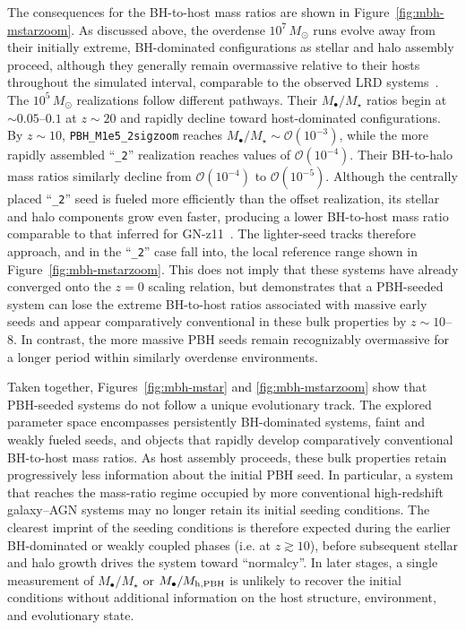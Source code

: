 \documentclass[twocolumn,trackchanges]{aastex701}
\begin{document}
The consequences for the BH-to-host mass ratios are shown in Figure~\ref{fig:mbh-mstarzoom}. As discussed above, the overdense $10^7\,M_\odot$ runs evolve away from their initially extreme, BH-dominated configurations as stellar and halo assembly proceed, although they generally remain overmassive relative to their hosts throughout the simulated interval, comparable to the observed LRD systems~\citep[e.g.,][]{MaiolinoBH2024A&A}. The $10^5\,M_\odot$ realizations follow different pathways. Their $M_\bullet/M_\star$ ratios begin at $\sim0.05$--$0.1$ at $z\sim20$ and rapidly decline toward host-dominated configurations. By $z\sim10$, \texttt{PBH\_M1e5\_2sigzoom} reaches $M_\bullet/M_\star\sim \mathcal{O}(10^{-3})$, while the more rapidly assembled ``\texttt{\_2}'' realization reaches values of $\mathcal{O}(10^{-4})$. Their BH-to-halo mass ratios similarly decline from $\mathcal{O}(10^{-4})$ to $\mathcal{O}(10^{-5})$. Although the centrally placed ``\texttt{\_2}'' seed is fueled more efficiently than the offset realization, its stellar and halo components grow even faster, producing a lower BH-to-host mass ratio comparable to that inferred for GN-z11~\citep{Bunker2023A&AGNz11,Scholtz2024A&A, Maiolino2024NaturBH}. The lighter-seed tracks therefore approach, and in the ``\texttt{\_2}'' case fall into, the local reference range shown in Figure~\ref{fig:mbh-mstarzoom}. This does not imply that these systems have already converged onto the $z=0$ scaling relation, but demonstrates that a PBH-seeded system can lose the extreme BH-to-host ratios associated with massive early seeds and appear comparatively conventional in these bulk properties by $z\sim10$--8. In contrast, the more massive PBH seeds remain recognizably overmassive for a longer period within similarly overdense environments.


Taken together, Figures~\ref{fig:mbh-mstar} and \ref{fig:mbh-mstarzoom} show that PBH-seeded systems do not follow a unique evolutionary track. The explored parameter space encompasses persistently BH-dominated systems, faint and weakly fueled seeds, and objects that rapidly develop comparatively conventional BH-to-host mass ratios. As host assembly proceeds, these bulk properties retain progressively less information about the initial PBH seed. In particular, a system that reaches the mass-ratio regime occupied by more conventional high-redshift galaxy--AGN systems may no longer retain its initial seeding conditions. The clearest imprint of the seeding conditions is therefore expected during the earlier BH-dominated or weakly coupled phases (i.e. at $z\gtrsim 10$), before subsequent stellar and halo growth drives the system toward ``normalcy''. In later stages, a single measurement of $M_\bullet/M_\star$ or $M_\bullet/M_{\rm h,PBH}$ is unlikely to recover the initial conditions without additional information on the host structure, environment, and evolutionary state.
\end{document}
